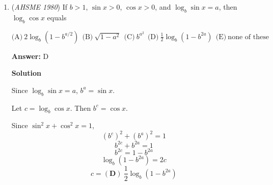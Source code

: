 \begin{enumerate}
 \textbf{Answer: }D



\textbf{Solution 1}

Expanding $(n+i)^4$ yields $n^4+4in^3-6n^2-4in+1 = (n^4-6n^2+1) + (4n^3-4n)i$.  This quantity is an integer if and only if $4n^3 - 4n = 4n(n+1)(n-1) = 0$, that is, if $n \in \{0, 1, -1\}$.  Therefore, there are $\boxed{(\textbf{D})\ 3}$ such values of $n$.

 -aopspandy, edited by j314andrews

 



\textbf{Solution 2}

For $(n+i)^4$ to be a real number, $n+i$ must be a scalar multiple of an eighth root of unity, that is, $n+i = r\left(\cos \frac{k\pi}{4} + i \sin \frac{k\pi}{4}\right)$ where $r \geq 0$ is a real number and $k$ is an integer such that $0 \leq k \leq 7$.  So $r \sin \frac{k\pi}{4} = 1$ and $\sin \frac{k\pi}{4}$ is positive.  Therefore, $k \in \{1, 2, 3\}$. 

 If $k = 1$, $r = \frac{1}{\sin\frac{\pi}{4}} = \sqrt{2}$, $n = \sqrt{2}\cos\frac{\pi}{4} = 1$ and $(n+i)^4 = (1+i)^4 = -4$.

 If $k = 2$, $r = \frac{1}{\sin\frac{\pi}{2}} = 1$, $n = \cos\frac{\pi}{2} = 0$ and $(n+i)^4 = i^4 = 1$.  

 If $k = 3$, $r = \frac{1}{\sin\frac{3\pi}{4}} = \sqrt{2}$, $n = \sqrt{2}\cos\frac{3\pi}{4} = -1$ and $(n+i)^4 = (-1+i)^4 = -4$.   

 In all these cases, $(n+i)^4$ is an integer, so $\{1, 0, -1\}$ are the $\boxed{(\mathbf{D})\ 3}$ possible values of $n$.

 


	\item (\textit{AHSME 1980}) If $b>1$, $\sin x>0$, $\cos x>0$, and $\log_b \sin x = a$, then $\log_b \cos x$ equals


 $\text{(A)} \ 2\log_b(1-b^{a/2}) ~~\text{(B)} \ \sqrt{1-a^2} ~~\text{(C)} \ b^{a^2} ~~\text{(D)} \ \frac 12 \log_b(1-b^{2a}) ~~\text{(E)} \ \text{none of these}$

 \textbf{Answer: }D



\textbf{Solution}

Since $\log_b \sin x = a$, $b^a=\sin x$.

 Let $c = \log_b \cos x$. Then $b^c=\cos x$.

 Since $\sin^2x+\cos^2x=1$, 
 \[(b^c)^2+(b^a)^2=1\]
 \[b^{2c}+b^{2a}=1\]
 \[b^{2c}=1-b^{2a}\]
 \[\log_b (1-b^{2a}) = 2c\]
 \[c=\boxed{(\textbf{D}) \ \frac 12 \log_b(1-b^{2a})}\]


\end{enumerate}
